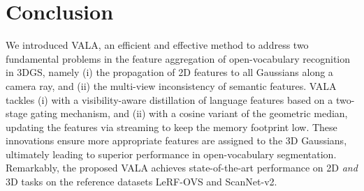 \section{Conclusion}
We introduced VALA, an efficient and effective method to address two fundamental problems in the feature aggregation of open-vocabulary recognition in 3DGS, namely (i) the propagation of 2D features to all Gaussians along a camera ray, and (ii) the multi-view inconsistency of semantic features. VALA tackles (i) with a visibility-aware distillation of language features based on a two-stage gating mechanism, and (ii) with a cosine variant of the geometric median, updating the features via streaming to keep the memory footprint low.
These innovations ensure more appropriate features are assigned to the 3D Gaussians, ultimately leading to superior performance in open-vocabulary segmentation. Remarkably, the proposed VALA achieves state-of-the-art performance on 2D \textit{and} 3D tasks on the reference datasets LeRF-OVS and ScanNet-v2.